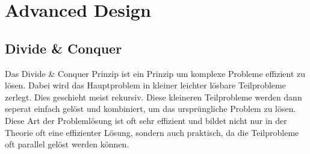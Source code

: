 \documentclass[
../../AuD-Zusammenfassung.tex,
]
{subfiles}
\begin{document}
\section{Advanced Design}
\subsection{Divide \& Conquer}
Das Divide \& Conquer Prinzip ist ein Prinzip um komplexe Probleme effizient zu lösen. Dabei wird das Hauptproblem in kleiner leichter lösbare Teilprobleme zerlegt. Dies geschieht meist rekursiv. Diese kleineren Teilprobleme werden dann seperat einfach gelöst und kombiniert, um das ursprüngliche Problem zu lösen. Diese Art der Problemlösung ist oft sehr effizient und bildet nicht nur in der Theorie oft eine effizienter Lösung, sondern auch praktisch, da die Teilprobleme oft parallel gelöst werden können.
\end{document}

